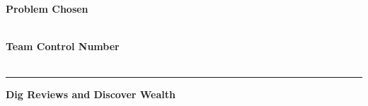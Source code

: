 \documentclass[../mcmpaper]{subfiles}
\begin{document}
	\thispagestyle{empty}
	\begingroup
	\setlength{\parindent}{0pt}
	\begin{minipage}[t]{0.33\linewidth}
		\bfseries\centering%
		Problem Chosen\\[0.7pc]
		{\Huge\textbf{\problem}}\\[2.8pc]
	\end{minipage}%
	\begin{minipage}[t]{0.33\linewidth}
		\centering%
		\textbf{\headset}%
	\end{minipage}%
	\begin{minipage}[t]{0.33\linewidth}
		\centering\bfseries%
		Team Control Number\\[0.7pc]
		{\Huge\textbf{\MCMcontrol}}\\[2.8pc]
	\end{minipage}\par
	\rule{\linewidth}{0.8pt}\par
	\par
	\endgroup
    \medskip
    \centerline{\bfseries\Large Dig Reviews and Discover Wealth}
\end{document}
